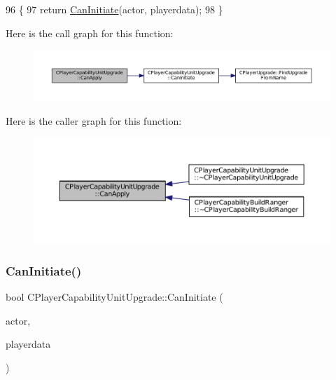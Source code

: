 \begin{DoxyCode}
96                                                                                                            
                                                        \{
97     \textcolor{keywordflow}{return} \hyperlink{classCPlayerCapabilityUnitUpgrade_ad01fc5df598efea4063ac2bbf0ba34e9}{CanInitiate}(actor, playerdata);
98 \}
\end{DoxyCode}
Here is the call graph for this function\+:
\nopagebreak
\begin{figure}[H]
\begin{center}
\leavevmode
\includegraphics[width=350pt]{classCPlayerCapabilityUnitUpgrade_a93d1a57f2cc52b90ce6cb714717bfefd_cgraph}
\end{center}
\end{figure}
Here is the caller graph for this function\+:
\nopagebreak
\begin{figure}[H]
\begin{center}
\leavevmode
\includegraphics[width=350pt]{classCPlayerCapabilityUnitUpgrade_a93d1a57f2cc52b90ce6cb714717bfefd_icgraph}
\end{center}
\end{figure}
\hypertarget{classCPlayerCapabilityUnitUpgrade_ad01fc5df598efea4063ac2bbf0ba34e9}{}\label{classCPlayerCapabilityUnitUpgrade_ad01fc5df598efea4063ac2bbf0ba34e9} 
\subsubsection{\texorpdfstring{Can\+Initiate()}{CanInitiate()}}
{\footnotesize\ttfamily bool C\+Player\+Capability\+Unit\+Upgrade\+::\+Can\+Initiate (\begin{DoxyParamCaption}\item[{std\+::shared\+\_\+ptr$<$ \hyperlink{classCPlayerAsset}{C\+Player\+Asset} $>$}]{actor,  }\item[{std\+::shared\+\_\+ptr$<$ \hyperlink{classCPlayerData}{C\+Player\+Data} $>$}]{playerdata }\end{DoxyParamCaption})\hspace{0.3cm}{\ttfamily [virtual]}}



